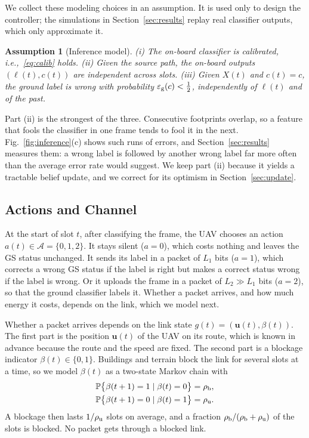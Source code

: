 \documentclass[5p,twocolumn]{elsarticle}
\newtheorem{assumption}{Assumption}
\theoremstyle{remark}
\newcommand{\Prob}{\mathbb{P}}
\newcommand{\A}{\mathcal{A}}
\newcommand{\lab}{\ell}
\newcommand{\ee}{\varepsilon}
\begin{document}
We collect these modeling choices in an assumption. It is used only to design the controller; the simulations in Section~\ref{sec:results} replay real classifier outputs, which only approximate it.

\begin{assumption}[Inference model]\label{as:inf}
(i) The on-board classifier is calibrated, i.e.,~\eqref{eq:calib} holds. (ii) Given the source path, the on-board outputs $(\lab(t),c(t))$ are independent across slots. (iii) Given $X(t)$ and $c(t)=c$, the ground label is wrong with probability $\ee_{\rm g}(c)<\tfrac12$, independently of $\lab(t)$ and of the past.
\end{assumption}

Part (ii) is the strongest of the three. Consecutive footprints overlap, so a feature that fools the classifier in one frame tends to fool it in the next. Fig.~\ref{fig:inference}(c) shows such runs of errors, and Section~\ref{sec:results} measures them: a wrong label is followed by another wrong label far more often than the average error rate would suggest. We keep part (ii) because it yields a tractable belief update, and we correct for its optimism in Section~\ref{sec:update}.

\subsection{Actions and Channel}\label{sec:act}
At the start of slot $t$, after classifying the frame, the UAV chooses an action $a(t)\in\A=\{0,1,2\}$. It stays silent ($a=0$), which costs nothing and leaves the GS status unchanged. It sends its label in a packet of $L_1$ bits ($a=1$), which corrects a wrong GS status if the label is right but makes a correct status wrong if the label is wrong. Or it uploads the frame in a packet of $L_2\gg L_1$ bits ($a=2$), so that the ground classifier labels it. Whether a packet arrives, and how much energy it costs, depends on the link, which we model next.

Whether a packet arrives depends on the link state $g(t)=(\mathbf{u}(t),\beta(t))$. The first part is the position $\mathbf{u}(t)$ of the UAV on its route, which is known in advance because the route and the speed are fixed. The second part is a blockage indicator $\beta(t)\in\{0,1\}$. Buildings and terrain block the link for several slots at a time, so we model $\beta(t)$ as a two-state Markov chain with
\begin{equation}\label{eq:block}
\begin{split}
\Prob\big\{\beta(t+1)=1\mid\beta(t)=0\big\}&=\rho_{\rm b},\\
\Prob\big\{\beta(t+1)=0\mid\beta(t)=1\big\}&=\rho_{\rm u}.
\end{split}
\end{equation}
A blockage then lasts $1/\rho_{\rm u}$ slots on average, and a fraction $\rho_{\rm b}/(\rho_{\rm b}+\rho_{\rm u})$ of the slots is blocked. No packet gets through a blocked link.
\end{document}
